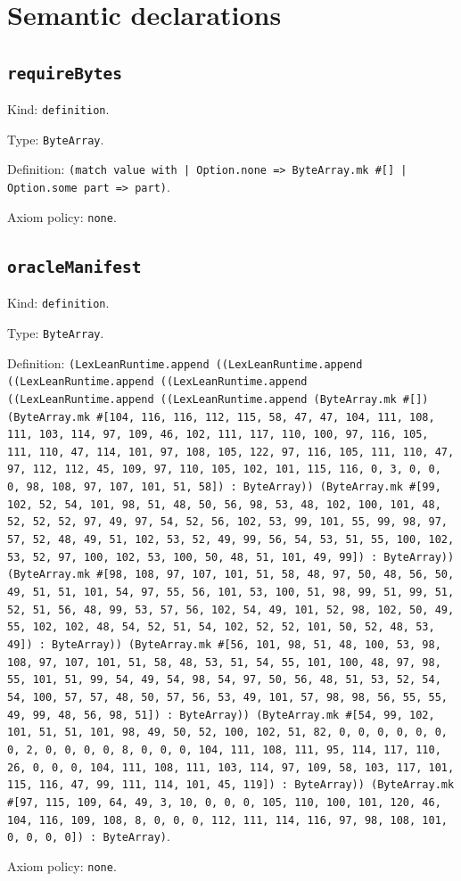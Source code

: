 \documentclass[11pt]{article}
\begin{document}
\section*{Semantic declarations}
\subsection*{\texttt{requireBytes}}
\noindent Kind: \texttt{definition}.\par
\noindent Type: \texttt{ByteArray}.\par
\noindent Definition: \texttt{(match value with | Option.none => ByteArray.mk \#[] | Option.some part => part)}.\par
\noindent Axiom policy: \texttt{none}.\par
\subsection*{\texttt{oracleManifest}}
\noindent Kind: \texttt{definition}.\par
\noindent Type: \texttt{ByteArray}.\par
\noindent Definition: \texttt{(LexLeanRuntime.append ((LexLeanRuntime.append ((LexLeanRuntime.append ((LexLeanRuntime.append ((LexLeanRuntime.append ((LexLeanRuntime.append (ByteArray.mk \#[]) (ByteArray.mk \#[104, 116, 116, 112, 115, 58, 47, 47, 104, 111, 108, 111, 103, 114, 97, 109, 46, 102, 111, 117, 110, 100, 97, 116, 105, 111, 110, 47, 114, 101, 97, 108, 105, 122, 97, 116, 105, 111, 110, 47, 97, 112, 112, 45, 109, 97, 110, 105, 102, 101, 115, 116, 0, 3, 0, 0, 0, 98, 108, 97, 107, 101, 51, 58]) : ByteArray)) (ByteArray.mk \#[99, 102, 52, 54, 101, 98, 51, 48, 50, 56, 98, 53, 48, 102, 100, 101, 48, 52, 52, 52, 97, 49, 97, 54, 52, 56, 102, 53, 99, 101, 55, 99, 98, 97, 57, 52, 48, 49, 51, 102, 53, 52, 49, 99, 56, 54, 53, 51, 55, 100, 102, 53, 52, 97, 100, 102, 53, 100, 50, 48, 51, 101, 49, 99]) : ByteArray)) (ByteArray.mk \#[98, 108, 97, 107, 101, 51, 58, 48, 97, 50, 48, 56, 50, 49, 51, 51, 101, 54, 97, 55, 56, 101, 53, 100, 51, 98, 99, 51, 99, 51, 52, 51, 56, 48, 99, 53, 57, 56, 102, 54, 49, 101, 52, 98, 102, 50, 49, 55, 102, 102, 48, 54, 52, 51, 54, 102, 52, 52, 101, 50, 52, 48, 53, 49]) : ByteArray)) (ByteArray.mk \#[56, 101, 98, 51, 48, 100, 53, 98, 108, 97, 107, 101, 51, 58, 48, 53, 51, 54, 55, 101, 100, 48, 97, 98, 55, 101, 51, 99, 54, 49, 54, 98, 54, 97, 50, 56, 48, 51, 53, 52, 54, 54, 100, 57, 57, 48, 50, 57, 56, 53, 49, 101, 57, 98, 98, 56, 55, 55, 49, 99, 48, 56, 98, 51]) : ByteArray)) (ByteArray.mk \#[54, 99, 102, 101, 51, 51, 101, 98, 49, 50, 52, 100, 102, 51, 82, 0, 0, 0, 0, 0, 0, 0, 2, 0, 0, 0, 0, 8, 0, 0, 0, 104, 111, 108, 111, 95, 114, 117, 110, 26, 0, 0, 0, 104, 111, 108, 111, 103, 114, 97, 109, 58, 103, 117, 101, 115, 116, 47, 99, 111, 114, 101, 45, 119]) : ByteArray)) (ByteArray.mk \#[97, 115, 109, 64, 49, 3, 10, 0, 0, 0, 105, 110, 100, 101, 120, 46, 104, 116, 109, 108, 8, 0, 0, 0, 112, 111, 114, 116, 97, 98, 108, 101, 0, 0, 0, 0]) : ByteArray)}.\par
\noindent Axiom policy: \texttt{none}.\par
\end{document}
